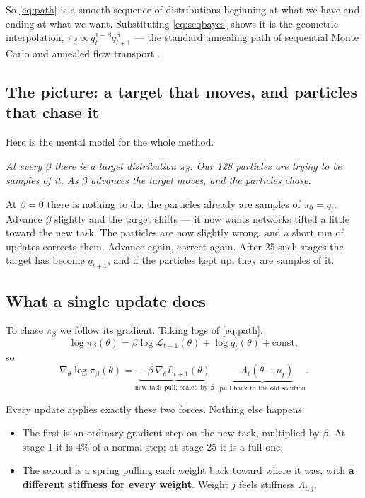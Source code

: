 \documentclass[11pt]{article}
\theoremstyle{definition}
\theoremstyle{plain}
\theoremstyle{remark}
\newcommand{\Lh}{\mathcal{L}}
\begin{document}
So \eqref{eq:path} is a smooth sequence of distributions beginning at what we
have and ending at what we want. Substituting \eqref{eq:seqbayes} shows it is
the geometric interpolation, $\pi_\beta \propto q_t^{1-\beta} q_{t+1}^{\beta}$ ---
the standard annealing path of sequential Monte Carlo and annealed flow
transport \cite{aft}.

\subsection{The picture: a target that moves, and particles that chase it}

Here is the mental model for the whole method.

\begin{center}
\emph{At every $\beta$ there is a target distribution $\pi_\beta$. Our 128
particles are trying to be samples of it. As $\beta$ advances the target moves,
and the particles chase.}
\end{center}

At $\beta = 0$ there is nothing to do: the particles already are samples of
$\pi_0 = q_t$. Advance $\beta$ slightly and the target shifts --- it now wants
networks tilted a little toward the new task. The particles are now slightly
wrong, and a short run of updates corrects them. Advance again, correct again.
After 25 such stages the target has become $q_{t+1}$, and if the particles kept
up, they are samples of it.

\subsection{What a single update does}

To chase $\pi_\beta$ we follow its gradient. Taking logs of \eqref{eq:path},
\begin{equation}
\log \pi_\beta(\theta) = \beta \log \Lh_{t+1}(\theta) + \log q_t(\theta) + \text{const},
\end{equation}
so
\begin{equation}
\nabla_\theta \log \pi_\beta(\theta)
=
\underbrace{-\,\beta\, \nabla_\theta L_{t+1}(\theta)}_{\text{new-task pull, scaled by }\beta}
\;\;
\underbrace{-\,\Lambda_t(\theta - \mu_t)}_{\text{pull back to the old solution}} .
\label{eq:twoforces}
\end{equation}

Every update applies exactly these two forces. Nothing else happens.

\begin{itemize}
\item The first is an ordinary gradient step on the new task, multiplied by
$\beta$. At stage 1 it is $4\%$ of a normal step; at stage 25 it is a full one.
\item The second is a spring pulling each weight back toward where it was, with
\textbf{a different stiffness for every weight}. Weight $j$ feels stiffness
$\Lambda_{t,j}$.
\end{itemize}
\end{document}
